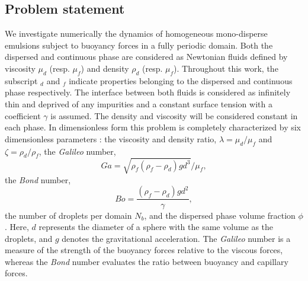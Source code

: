 \subsection{Problem statement}

We investigate numerically the dynamics of homogeneous mono-disperse emulsions subject to buoyancy forces in a fully periodic domain. 
Both the dispersed and continuous phase are considered as Newtonian fluids defined by viscosity $\mu_d$ (resp. $\mu_f$) and density $\rho_d$ (resp. $\mu_f$).
Throughout this work, the subscript $_d$ and $_f$ indicate properties belonging to the dispersed and continuous phase respectively. 
The interface between both fluids is considered as infinitely thin and deprived of any impurities and a constant surface tension with a coefficient $\gamma$ is assumed. 
The density and viscosity will be considered constant in each phase.
In dimensionless form this problem is completely characterized by six dimensionless parameters :  the viscosity and density ratio, $\lambda = \mu_d / \mu_f$ and $\zeta = \rho_d / \rho_f$,  
the \textit{Galileo} number, 
\begin{equation*}
    Ga =\sqrt{\rho_f(\rho_f - \rho_d) g d^3} / \mu_f,
\end{equation*}
the \textit{Bond} number, 
\begin{equation*}
    Bo =\frac{(\rho_f - \rho_d) g d^2}{\gamma},
\end{equation*}
the number of droplets per domain $N_b$, and the dispersed phase volume fraction $\phi$. 
Here, $d$ represents the diameter of a sphere with the same volume as the droplets, and $g$ denotes the gravitational acceleration.
The \textit{Galileo} number is a measure of the strength of the buoyancy forces relative to the viscous forces, whereas the \textit{Bond} number evaluates the ratio between buoyancy and capillary forces. 

